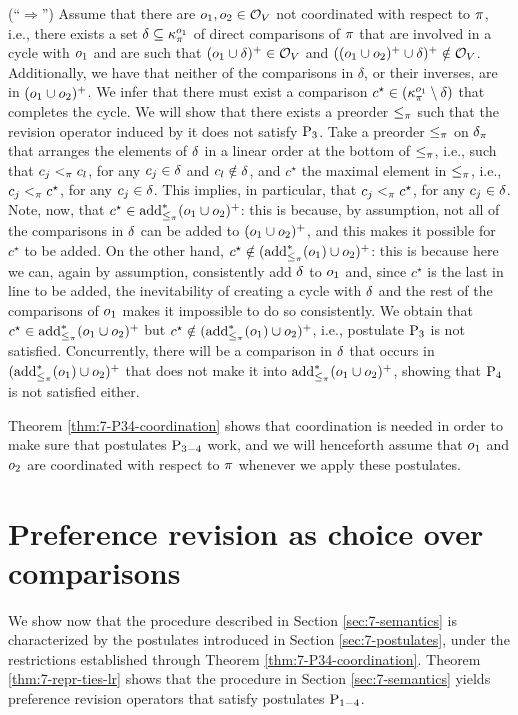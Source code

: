 \begin{prf*}{}{}
	
	(``$\Rightarrow$'')
	Assume that there are $o_1,o_2\in\mathcal{O}_V$ not coordinated with respect to $\pi$,
	i.e., there exists a set $\delta\subseteq\kappa_{\pi}^{o_1}$ of direct comparisons of $\pi$
	that are involved in a cycle with $o_1$ and are such that
	$(o_1\cup\delta)^+\in\mathcal{O}_V$ and $((o_1\cup o_2)^+\cup\delta)^+\notin\mathcal{O}_V$.
	Additionally, we have that neither of the comparisons in $\delta$, 
	or their inverses, are in $(o_1\cup o_2)^+$.
	We infer that there must exist a comparison $c^\star\in(\kappa_{\pi}^{o_1}\setminus\delta)$
	that completes the cycle. 
	We will show that there exists a preorder $\le_\pi$ 
	such that the revision operator	induced by it does not satisfy $\mathrm{P}_{3}$.
	Take a preorder $\le_\pi$ on $\delta_\pi$ that arranges the elements 
	of $\delta$ in a linear order at the bottom of $\le_\pi$, 
	i.e., such that $c_j<_\pi c_l$, for any $c_j\in\delta$ and $c_l\notin\delta$,
	and $c^\star$ the maximal element in $\le_\pi$,
	i.e., $c_j<_\pi c^\star$, for any $c_j\in\delta$.
	This implies, in particular, that $c_j<_\pi c^\star$, for any $c_j\in\delta$.
	Note, now, that $c^\star\in{\operatorname{add}}_{\le_\pi}^\ast(o_1\cup o_2)^+$: 
	this is because, by assumption, not all of the comparisons in 
	$\delta$ can be added to $(o_1\cup o_2)^+$,
	and this makes it possible for $c^\star$ to be added.
	On the other hand, $c^\star\notin({\operatorname{add}}^\ast_{\le_\pi}(o_1)\cup o_2)^+$:
	this is because here we can, again by assumption, consistently add $\delta$ to $o_1$ and,
	since $c^\star$ is the last in line to be added, the inevitability
	of creating a cycle with $\delta$ and the rest of the comparisons of $o_1$
	makes it impossible to do so consistently. 
	We obtain that $c^\star\in{\operatorname{add}}_{\le_\pi}^\ast(o_1\cup o_2)^+$ but 
	$c^\star\notin({\operatorname{add}}^\ast_{\le_\pi}(o_1)\cup o_2)^+$, i.e., postulate $\mathrm{P}_{3}$ is not satisfied.
	Concurrently, there will be a comparison in $\delta$ that occurs in $({\operatorname{add}}^\ast_{\le_\pi}(o_1)\cup o_2)^+$
	that does not make it into ${\operatorname{add}}^\ast_{\le_\pi}(o_1\cup o_2)^+$, 
	showing that $\mathrm{P}_{4}$ is not satisfied either.
\end{prf*}

Theorem \ref{thm:7-P34-coordination} shows that coordination is needed in order to make
sure that postulates $\mathrm{P}_{3-4}$ work, and we will henceforth assume that $o_1$ and $o_2$ 
are coordinated with respect to $\pi$ whenever we apply these postulates.








\section{Preference revision as choice over comparisons}\label{sec:7-representation}
We show now that the procedure described in 
Section \ref{sec:7-semantics} is characterized
by the postulates introduced 
in Section \ref{sec:7-postulates}, under the restrictions
established through Theorem \ref{thm:7-P34-coordination}.
Theorem \ref{thm:7-repr-ties-lr} shows that the procedure in 
Section \ref{sec:7-semantics} 
yields preference revision operators that satisfy postulates $\mathrm{P}_{1-4}$.


